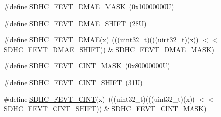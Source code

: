 \begin{DoxyCompactItemize}
\item 
\#define \mbox{\hyperlink{group___s_d_h_c___register___masks_gad91681b40c16fc4d1fcefe155d3437cb}{S\+D\+H\+C\+\_\+\+F\+E\+V\+T\+\_\+\+D\+M\+A\+E\+\_\+\+M\+A\+SK}}~(0x10000000\+U)
\item 
\#define \mbox{\hyperlink{group___s_d_h_c___register___masks_ga5899ac8c06de1bf1164fb10a8ee67bde}{S\+D\+H\+C\+\_\+\+F\+E\+V\+T\+\_\+\+D\+M\+A\+E\+\_\+\+S\+H\+I\+FT}}~(28\+U)
\item 
\#define \mbox{\hyperlink{group___s_d_h_c___register___masks_ga4d43ea04c031578a26bb59827cf6a215}{S\+D\+H\+C\+\_\+\+F\+E\+V\+T\+\_\+\+D\+M\+AE}}(x)~(((uint32\+\_\+t)(((uint32\+\_\+t)(x)) $<$$<$ \mbox{\hyperlink{group___s_d_h_c___register___masks_ga5899ac8c06de1bf1164fb10a8ee67bde}{S\+D\+H\+C\+\_\+\+F\+E\+V\+T\+\_\+\+D\+M\+A\+E\+\_\+\+S\+H\+I\+FT}})) \& \mbox{\hyperlink{group___s_d_h_c___register___masks_gad91681b40c16fc4d1fcefe155d3437cb}{S\+D\+H\+C\+\_\+\+F\+E\+V\+T\+\_\+\+D\+M\+A\+E\+\_\+\+M\+A\+SK}})
\item 
\#define \mbox{\hyperlink{group___s_d_h_c___register___masks_gab421860ddd2b50ee334649e5cf9f4475}{S\+D\+H\+C\+\_\+\+F\+E\+V\+T\+\_\+\+C\+I\+N\+T\+\_\+\+M\+A\+SK}}~(0x80000000\+U)
\item 
\#define \mbox{\hyperlink{group___s_d_h_c___register___masks_ga0eb0abd3e2107c4b5d2dc801b3b1a067}{S\+D\+H\+C\+\_\+\+F\+E\+V\+T\+\_\+\+C\+I\+N\+T\+\_\+\+S\+H\+I\+FT}}~(31\+U)
\item 
\#define \mbox{\hyperlink{group___s_d_h_c___register___masks_ga9e5036b9e0b1a0d65b3d74bc0c125304}{S\+D\+H\+C\+\_\+\+F\+E\+V\+T\+\_\+\+C\+I\+NT}}(x)~(((uint32\+\_\+t)(((uint32\+\_\+t)(x)) $<$$<$ \mbox{\hyperlink{group___s_d_h_c___register___masks_ga0eb0abd3e2107c4b5d2dc801b3b1a067}{S\+D\+H\+C\+\_\+\+F\+E\+V\+T\+\_\+\+C\+I\+N\+T\+\_\+\+S\+H\+I\+FT}})) \& \mbox{\hyperlink{group___s_d_h_c___register___masks_gab421860ddd2b50ee334649e5cf9f4475}{S\+D\+H\+C\+\_\+\+F\+E\+V\+T\+\_\+\+C\+I\+N\+T\+\_\+\+M\+A\+SK}})
\end{DoxyCompactItemize}
